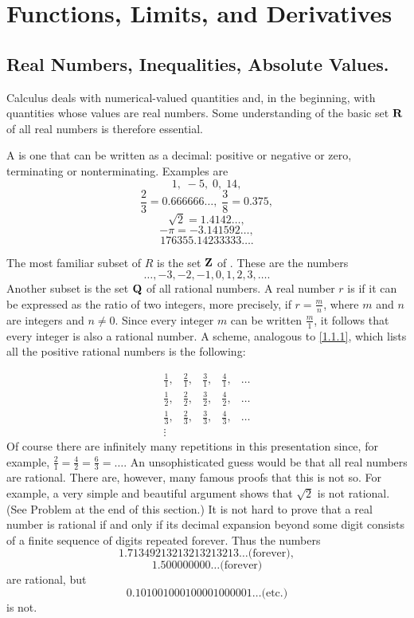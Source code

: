\chapter{Functions, Limits, and Derivatives} \label{chp 1}

\section{Real Numbers, Inequalities, Absolute Values.}\label{sec 1.1} 

Calculus deals with numerical-valued quantities and,
in the beginning, with quantities whose values are real numbers.
Some understanding of the basic set $\mathrm{\bf R}$ of all real numbers
is therefore essential.

A  is one that can be written as a decimal:
positive or negative or zero, terminating or nonterminating.
Examples are
\[
1, \;-5, \;0, \;14,
\]
\[
\frac{2}{3} = 0.666666 \ldots, \; \frac{3}{8} = 0.375,
\]
\[
\sqrt{2} = 1.4142 \ldots,
\]
\[
-\pi = -3.141592\ldots,
\]
\[
176355.14233333 \ldots
.
\]

The most familiar subset of $R$ is the set $\mathrm{\bf Z}$ of .
These are the numbers
\begin{equation}
\ldots, -3, -2, -1, 0, 1, 2, 3,\ldots .   
\label{eq1.1.1}
\end{equation}
Another subset is the set $\mathrm{\bf Q}$ of all rational numbers.
A real number $r$ is 
if it can be expressed as the ratio of two integers,
more precisely,
if $r = \frac{m}{n}$,
where $m$ and $n$ are integers and $n \neq 0$.
Since every integer $m$ can be  written $\frac{m}{1}$,
it follows that every integer is also a rational number.
A scheme, analogous to \eqref{1.1.1},
which lists all the positive rational
numbers is the following:

\begin{equation}
\label{eq1.1.2}
\begin{array}{ccccc}
\frac{1}{1}, & \frac{2}{1}, & \frac{3}{1}, & \frac{4}{1}, & \ldots\\
\frac{1}{2}, & \frac{2}{2}, & \frac{3}{2}, & \frac{4}{2}, & \ldots\\
\frac{1}{3}, & \frac{2}{3}, & \frac{3}{3}, & \frac{4}{3}, & \ldots\\
\vdots
\end{array}
\end{equation} 
Of course there are infinitely many repetitions in this presentation since,
for example,
$\frac{2}{1} = \frac{4}{2} = \frac{6}{3} = \ldots.$
An unsophisticated guess would be that all real numbers are rational.
There are, however, many famous proofs that this is not so.
For example,
a very simple and beautiful argument shows that $\sqrt 2$ is not rational.
(See Problem  at the end of this section.)
It is not hard to prove that a real number is rational
if and only if its decimal expansion beyond some digit
consists of a finite sequence of digits repeated forever.
Thus the numbers
\[
1.71349213213213213213 \ldots \mbox{(forever)} ,
\]
\[
1.500000000 \ldots \mbox{(forever)}
\]
are rational, but
\[
0.101001000100001000001 \ldots \mbox{(etc.)}
\]
is not.

